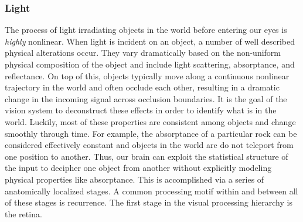 \subsubsection{Light}
The process of light irradiating objects in the world before entering our eyes is \textit{highly} nonlinear. When light is incident on an object, a number of well described physical alterations occur. They vary dramatically based on the non-uniform physical composition of the object and include light scattering, absorptance, and reflectance. On top of this, objects typically move along a continuous nonlinear trajectory in the world and often occlude each other, resulting in a dramatic change in the incoming signal across occlusion boundaries. It is the goal of the vision system to deconstruct these effects in order to identify what is in the world. Luckily, most of these properties are consistent among objects and change smoothly through time. For example, the absorptance of a particular rock can be considered effectively constant and objects in the world are do not teleport from one position to another. Thus, our brain can exploit the statistical structure of the input to decipher one object from another without explicitly modeling physical properties like absorptance. This is accomplished via a series of anatomically localized stages. A common processing motif within and between all of these stages is recurrence. The first stage in the visual processing hierarchy is the retina.



